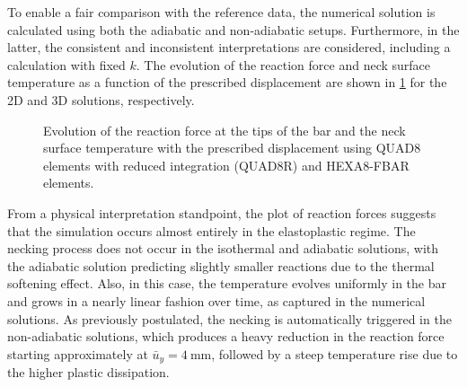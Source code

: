To enable a fair comparison with the reference data, the numerical solution is calculated using both the adiabatic and non-adiabatic setups.
Furthermore, in the latter, the consistent and inconsistent interpretations are considered, including a calculation with fixed $k$.
The evolution of the reaction force and neck surface temperature as a function of the prescribed displacement are shown in \ref{fig:necking-results} for the 2D and 3D solutions, respectively.
\begin{figure}[!p]
  \centering
  \caption{Evolution of the reaction force at the tips of the bar and the neck surface temperature with the prescribed displacement using QUAD8 elements with reduced integration (QUAD8R) and HEXA8-FBAR elements.}
  \label{fig:necking-results}
\end{figure}
%
From a physical interpretation standpoint, the plot of reaction forces suggests that the simulation occurs almost entirely in the elastoplastic regime.
The necking process does not occur in the isothermal and adiabatic solutions, with the adiabatic solution predicting slightly smaller reactions due to the thermal softening effect.
Also, in this case, the temperature evolves uniformly in the bar and grows in a nearly linear fashion over time, as captured in the numerical solutions.
As previously postulated, the necking is automatically triggered in the non-adiabatic solutions, which produces a heavy reduction in the reaction force starting approximately at $\bar{u}_{y}=\SI{4}{\milli\meter}$, followed by a steep temperature rise due to the higher plastic dissipation.

